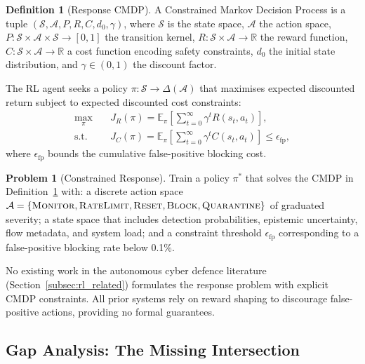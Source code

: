 \documentclass[journal]{IEEEtran}
\theoremstyle{definition}
\newtheorem{definition}{Definition}
\newtheorem{problem}{Problem}
\theoremstyle{remark}
\newcommand{\expect}{\mathbb{E}}
\newcommand{\real}{\mathbb{R}}
\begin{document}
\begin{definition}[Response CMDP]
\label{def:cmdp}
A Constrained Markov Decision Process is a tuple $(\mathcal{S}, \mathcal{A}, P, R, C, d_0, \gamma)$, where $\mathcal{S}$ is the state space, $\mathcal{A}$ the action space, $P: \mathcal{S} \times \mathcal{A} \times \mathcal{S} \to [0,1]$ the transition kernel, $R: \mathcal{S} \times \mathcal{A} \to \real$ the reward function, $C: \mathcal{S} \times \mathcal{A} \to \real$ a cost function encoding safety constraints, $d_0$ the initial state distribution, and $\gamma \in (0,1)$ the discount factor.
\end{definition}

The RL agent seeks a policy $\pi: \mathcal{S} \to \Delta(\mathcal{A})$ that maximises expected discounted return subject to expected discounted cost constraints:
\begin{align}
\max_\pi \quad & J_R(\pi) = \expect_\pi\!\left[\sum_{t=0}^{\infty}\gamma^t R(s_t, a_t)\right], \label{eq:cmdp_obj}\\
\text{s.t.} \quad & J_C(\pi) = \expect_\pi\!\left[\sum_{t=0}^{\infty}\gamma^t C(s_t, a_t)\right] \leq \epsilon_{\mathrm{fp}}, \label{eq:cmdp_constr}
\end{align}
where $\epsilon_{\mathrm{fp}}$ bounds the cumulative false-positive blocking cost.

\begin{problem}[Constrained Response]
\label{prob:rl}
Train a policy $\pi^*$ that solves the CMDP in Definition~\ref{def:cmdp} with: a discrete action space $\mathcal{A} = \{\textsc{Monitor}, \textsc{RateLimit}, \textsc{Reset}, \textsc{Block}, \textsc{Quarantine}\}$ of graduated severity; a state space that includes detection probabilities, epistemic uncertainty, flow metadata, and system load; and a constraint threshold $\epsilon_{\mathrm{fp}}$ corresponding to a false-positive blocking rate below 0.1\%.
\end{problem}

No existing work in the autonomous cyber defence literature (Section~\ref{subsec:rl_related}) formulates the response problem with explicit CMDP constraints. All prior systems rely on reward shaping to discourage false-positive actions, providing no formal guarantees.

\subsection{Gap Analysis: The Missing Intersection}
\label{subsec:gaps}
\end{document}
